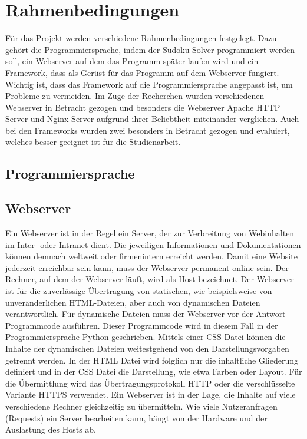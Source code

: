 
\chapter{Rahmenbedingungen}
Für das Projekt werden verschiedene Rahmenbedingungen festgelegt. Dazu gehört die Programmiersprache, indem der Sudoku Solver programmiert werden soll, ein Webserver auf dem das Programm später laufen wird und ein Framework, dass als Gerüst für das Programm auf dem Webserver fungiert. Wichtig ist, dass das Framework auf die Programmiersprache angepasst ist, um Probleme zu vermeiden. Im Zuge der Recherchen wurden verschiedenen Webserver in Betracht gezogen und besonders die Webserver Apache HTTP Server und Nginx Server aufgrund ihrer Beliebtheit miteinander verglichen. Auch bei den Frameworks wurden zwei besonders in Betracht gezogen und evaluiert, welches besser geeignet ist für die Studienarbeit.

\section{Programmiersprache}


\section{Webserver}
Ein Webserver ist in der Regel ein Server, der zur Verbreitung von Webinhalten im Inter- oder Intranet dient. Die jeweiligen Informationen und Dokumentationen können demnach weltweit oder firmenintern erreicht werden. Damit eine Website jederzeit erreichbar sein kann, muss der Webserver permanent online sein.
Der Rechner, auf dem der Webserver läuft, wird als Host bezeichnet. Der Webserver ist für die zuverlässige Übertragung von statischen, wie beispielsweise von unveränderlichen \ac{HTML}-Dateien, aber auch von dynamischen Dateien verantwortlich. Für dynamische Dateien muss der Webserver vor der Antwort Programmcode ausführen. Dieser Programmcode wird in diesem Fall in der Programmiersprache Python geschrieben. Mittels einer \ac{CSS} Datei können die Inhalte der dynamischen Dateien weitestgehend von den Darstellungsvorgaben getrennt werden. In der \ac{HTML} Datei wird folglich nur die inhaltliche Gliederung definiert und in der \ac{CSS} Datei die Darstellung, wie etwa Farben oder Layout.
Für die Übermittlung wird das Übertragungsprotokoll \ac{HTTP} oder die verschlüsselte Variante \ac{HTTPS} verwendet.
Ein Webserver ist in der Lage, die Inhalte auf viele verschiedene Rechner gleichzeitig zu übermitteln. Wie viele Nutzeranfragen (Requests) ein Server bearbeiten kann, hängt von der Hardware und der Auslastung des Hosts ab.

